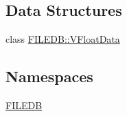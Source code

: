 \subsection*{Data Structures}
\begin{DoxyCompactItemize}
\item 
class \mbox{\hyperlink{classFILEDB_1_1VFloatData}{F\+I\+L\+E\+D\+B\+::\+V\+Float\+Data}}
\end{DoxyCompactItemize}
\subsection*{Namespaces}
\begin{DoxyCompactItemize}
\item 
 \mbox{\hyperlink{namespaceFILEDB}{F\+I\+L\+E\+DB}}
\end{DoxyCompactItemize}
